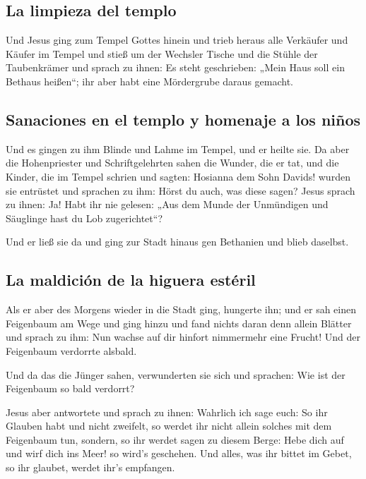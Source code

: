 \hypertarget{la-limpieza-del-templo}{%
\subsection{La limpieza del templo}\label{la-limpieza-del-templo}}

 Und Jesus ging zum Tempel Gottes hinein und trieb heraus
alle Verkäufer und Käufer im Tempel und stieß um der Wechsler Tische und
die Stühle der Taubenkrämer  und sprach zu ihnen: Es
steht geschrieben: „Mein Haus soll ein Bethaus heißen``; ihr aber habt
eine Mördergrube daraus gemacht.

\hypertarget{sanaciones-en-el-templo-y-homenaje-a-los-niuxf1os}{%
\subsection{Sanaciones en el templo y homenaje a los
niños}\label{sanaciones-en-el-templo-y-homenaje-a-los-niuxf1os}}

 Und es gingen zu ihm Blinde und Lahme im Tempel, und er
heilte sie.  Da aber die Hohenpriester und
Schriftgelehrten sahen die Wunder, die er tat, und die Kinder, die im
Tempel schrien und sagten: Hosianna dem Sohn Davids! wurden sie
entrüstet  und sprachen zu ihm: Hörst du auch, was diese
sagen? Jesus sprach zu ihnen: Ja! Habt ihr nie gelesen: „Aus dem Munde
der Unmündigen und Säuglinge hast du Lob zugerichtet``?

 Und er ließ sie da und ging zur Stadt hinaus gen
Bethanien und blieb daselbst.

\hypertarget{la-maldiciuxf3n-de-la-higuera-estuxe9ril}{%
\subsection{La maldición de la higuera
estéril}\label{la-maldiciuxf3n-de-la-higuera-estuxe9ril}}

 Als er aber des Morgens wieder in die Stadt ging,
hungerte ihn;  und er sah einen Feigenbaum am Wege und
ging hinzu und fand nichts daran denn allein Blätter und sprach zu ihm:
Nun wachse auf dir hinfort nimmermehr eine Frucht! Und der Feigenbaum
verdorrte alsbald.

 Und da das die Jünger sahen, verwunderten sie sich und
sprachen: Wie ist der Feigenbaum so bald verdorrt?

 Jesus aber antwortete und sprach zu ihnen: Wahrlich ich
sage euch: So ihr Glauben habt und nicht zweifelt, so werdet ihr nicht
allein solches mit dem Feigenbaum tun, sondern, so ihr werdet sagen zu
diesem Berge: Hebe dich auf und wirf dich ins Meer! so wird's geschehen.
 Und alles, was ihr bittet im Gebet, so ihr glaubet,
werdet ihr's empfangen.

